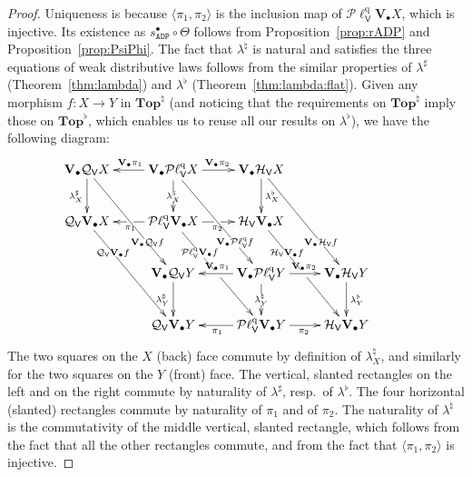 \documentclass[preprint,12pt]{elsarticle}
\newcommand\Angel{{\mathtt{A}}}
\newcommand\Demon{{\mathtt{D}}}
\newcommand\Nature{{\mathtt{P}}}
\newcommand\ADN{{\Angel\Demon\Nature}}
\newcommand\Smyth{{\mathcal Q}}
\newcommand\Hoare{{\mathcal H}}
\newcommand\Vt{\mathsf{V}}
\newcommand\HV{\Hoare_\Vt}
\newcommand\SV{\Smyth_{\Vt}}
\newcommand\quasi{\mathrm{q}} %
\newcommand\QL{\Plotkin^\quasi}
\newcommand\QLV{\QL_\Vt}
\newcommand\Plotkin{\mathcal P\ell} %
\newcommand\Val{{\mathbf V}}
\newcommand\Topcat{\mathbf{Top}}
\begin{document}
\begin{proof}
  Uniqueness is because $\langle \pi_1, \pi_2 \rangle$ is the
  inclusion map of $\QLV {\Val_\bullet X}$, which is injective.  Its
  existence as $s_\ADN^\bullet \circ \Theta$ follows from
  Proposition~\ref{prop:rADP} and Proposition~\ref{prop:PsiPhi}.  The
  fact that $\lambda^\natural$ is natural and satisfies the three
  equations of weak distributive laws follows from the similar
  properties of $\lambda^\sharp$ (Theorem~\ref{thm:lambda}) and
  $\lambda^\flat$ (Theorem~\ref{thm:lambda:flat}).  Given any morphism
  $f \colon X \to Y$ in $\Topcat^\natural$ (and noticing that the
  requirements on $\Topcat^\natural$ imply those on $\Topcat^\flat$,
  which enables us to reuse all our results on $\lambda^\flat$), we
  have the following diagram:
  \[
    \xymatrix{
      \Val_\bullet {\SV X}
      \ar[rdd]|(0.7){\Val_\bullet {\SV f}}
      \ar[d]_{\lambda^\sharp_X}
      & \Val_\bullet {\QLV X}
      \ar[rdd]|(0.7){\Val_\bullet {\QLV f}}
      \ar[l]_{\Val_\bullet {\pi_1}}
      \ar[d]|{\lambda^\natural_X}
      \ar[r]^{\Val_\bullet {\pi_2}}
      & \Val_\bullet {\HV X}
      \ar[rdd]|(0.7){\Val_\bullet {\HV f}}
      \ar[d]^{\lambda^\flat_X}
      \\
      \SV {\Val_\bullet X}
      \ar[rdd]|(0.3){\SV {\Val_\bullet f}}
      & \QLV {\Val_\bullet X}
      \ar[rdd]|(0.3){\QLV {\Val_\bullet f}}|!{[d];[rd]}{\hole}
      \ar[l]|{\hole}^{\pi_1}
      \ar[r]|{\hole}_{\pi_2}
      & \HV {\Val_\bullet X}
      \ar[rdd]|(0.3){\HV {\Val_\bullet f}}|!{[d];[rd]}{\hole}
      &
      \\
      &
      \Val_\bullet {\SV Y}
      \ar[d]_{\lambda^\sharp_Y}
      & \Val_\bullet {\QLV Y}
      \ar[l]_{\Val_\bullet {\pi_1}}
      \ar[d]|{\lambda^\natural_Y}
      \ar[r]^{\Val_\bullet {\pi_2}}
      & \Val_\bullet {\HV Y}
      \ar[d]^{\lambda^\flat_Y}
      &
      \\
      &
      \SV {\Val_\bullet Y}
      & \QLV {\Val_\bullet Y}
      \ar[l]^{\pi_1}
      \ar[r]_{\pi_2}
      & \HV {\Val_\bullet Y}
    }
  \]
  The two squares on the $X$ (back) face commute by definition of
  $\lambda^\natural_X$, and similarly for the two squares on the $Y$
  (front) face.  The vertical, slanted rectangles on the left and on
  the right commute by naturality of $\lambda^\sharp$, resp.\ of
  $\lambda^\flat$.  The four horizontal (slanted) rectangles commute
  by naturality of $\pi_1$ and of $\pi_2$.  The naturality of
  $\lambda^\natural$ is the commutativity of the middle vertical,
  slanted rectangle, which follows from the fact that all the other
  rectangles commute, and from the fact that
  $\langle \pi_1, \pi_2 \rangle$ is injective.


\end{proof}
\end{document}
